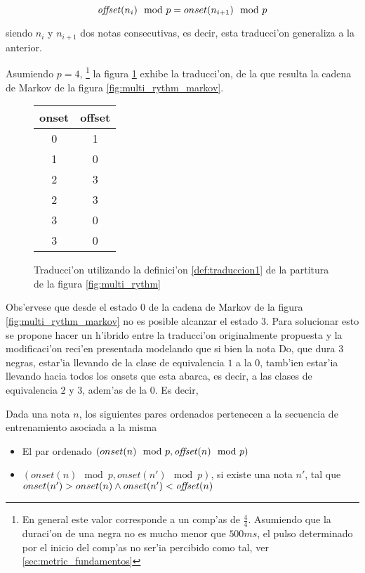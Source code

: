 $$\text{\emph{offset}}(n_i)\mod p = onset(n_{i+1}) \mod p$$

siendo $n_i$ y $n_{i+1}$ dos notas consecutivas, es decir, esta traducci'on generaliza a la anterior. 

Asumiendo $p=4$, \footnote{En general este valor corresponde a un comp'as de $\frac{4}{4}$. Asumiendo que la duraci'on de una negra no es mucho menor que $500ms$, el pulso determinado por el inicio del comp'as no ser'ia percibido como tal, ver \ref{sec:metric_fundamentos} }
la figura \ref{fig:multi_rythm_translation} exhibe la traducci'on, de la que resulta la cadena de Markov de la figura \ref{fig:multi_rythm_markov}.

\begin{figure}[!h]
\begin{center}
\begin{tabular}{c | c} 
onset & offset \\
\hline
0 & 1 \\
1 & 0 \\
2 & 3 \\
2 & 3 \\
3 & 0 \\
3 & 0 \\
\end{tabular}
\caption{ Traducci'on utilizando la definici'on \ref{def:traduccion1} de la partitura de la figura \ref{fig:multi_rythm}}
\label{fig:multi_rythm_translation}

\end{center}
\end{figure}

\begin{imagen}
    \width{7cm}
\end{imagen}

Obs'ervese que desde el estado $0$ de la cadena de Markov de la figura \ref{fig:multi_rythm_markov} no es posible alcanzar el estado $3$. Para solucionar esto se propone hacer un h'ibrido
entre la traducci'on originalmente propuesta y la modificaci'on reci'en presentada modelando que si bien la nota Do, que dura $3$ negras, estar'ia
llevando de la clase de equivalencia $1$ a la $0$, tamb'ien estar'ia llevando hacia todos los onsets que esta abarca, es decir,
a las clases de equivalencia $2$ y $3$, adem'as de la $0$. Es decir,


\begin{definition}
\label{def:traduccion2}
Dada una nota $n$, los siguientes pares ordenados pertenecen a la secuencia de entrenamiento asociada a la misma
\begin{itemize}
 \item El par ordenado $(onset(n) \mod p, \text{\emph{offset}}(n)\mod p)$
 \item $(onset(n) \mod p, onset(n') \mod p)$, si existe una nota $n'$, tal que $onset(n') > onset(n) \land onset(n') < \text{\emph{offset}}(n)$
\end{itemize}
\end{definition}

